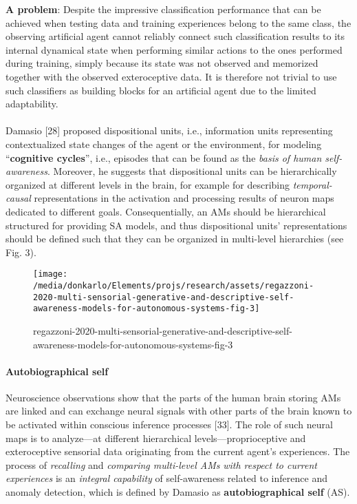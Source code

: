 \documentclass{article}
\begin{document}
			\textbf{A problem}: Despite the impressive classification performance that can be
			achieved when testing data and training experiences belong to
			the same class, the observing artificial agent cannot reliably
			connect such classification results to its internal dynamical
			state when performing similar actions to the ones performed
			during training, simply because its state was not observed and
			memorized together with the observed exteroceptive data. It is therefore not trivial to use such classifiers as building blocks for an artificial agent due to the limited adaptability. 
			
			\paragraph{} Damasio [28] proposed dispositional units, i.e., information units representing contextualized state changes of the
			agent or the environment, for modeling “\textbf{cognitive cycles}”,
			i.e., episodes that can be found as the \emph{basis of human self-awareness}. Moreover, he suggests that dispositional units can
			be hierarchically organized at different levels in the brain, for
			example for describing \emph{temporal-causal} representations in the
			activation and processing results of neuron maps dedicated to
			different goals. Consequentially, an AMs should be hierarchical structured for providing SA models, and thus dispositional
			units’ representations should be defined such that they can be organized in multi-level hierarchies (see Fig. 3).
			\begin{figure*}
				\centering
				\texttt{[image: /media/donkarlo/Elements/projs/research/assets/regazzoni-2020-multi-sensorial-generative-and-descriptive-self-awareness-models-for-autonomous-systems-fig-3]}
				\caption{regazzoni-2020-multi-sensorial-generative-and-descriptive-self-awareness-models-for-autonomous-systems-fig-3}
				\label{fig:regazzoni-2020-multi-sensorial-generative-and-descriptive-self-awareness-models-for-autonomous-systems-fig-3.png}
			\end{figure*}
			
			\paragraph{Autobiographical self} Neuroscience observations show that the parts of the human
			brain storing AMs are linked and can exchange neural signals with other parts of the brain known to be activated within conscious inference processes [33]. The role of such neural maps is to analyze—at different hierarchical levels—proprioceptive and exteroceptive sensorial data originating from the current agent’s experiences. The process of \emph{recalling} and \emph{comparing multi-level AMs}\emph{ with respect to current experiences} is an \emph{integral capability} of self-awareness related to inference and anomaly detection, which is defined by Damasio as \textbf{autobiographical self} (AS). 
\end{document}
